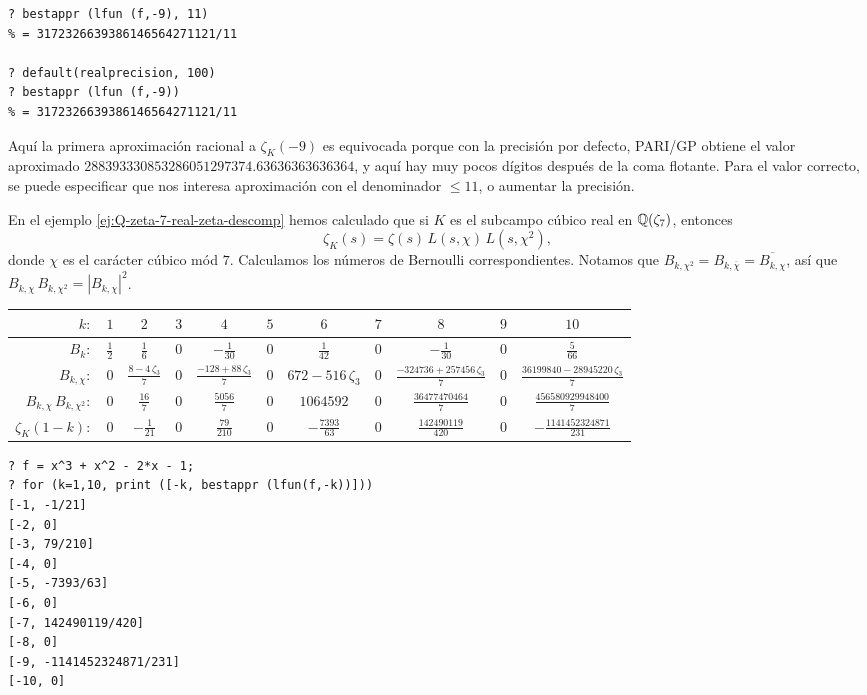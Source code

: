 \begin{ejemplo}
\begin{shaded}
\begin{verbatim}
? bestappr (lfun (f,-9), 11)
% = 3172326639386146564271121/11

? default(realprecision, 100)
? bestappr (lfun (f,-9))
% = 3172326639386146564271121/11
\end{verbatim}
\end{shaded}

  Aquí la primera aproximación racional a $\zeta_K (-9)$ es equivocada porque
  con la precisión por defecto, PARI/GP obtiene el valor aproximado
  $288393330853286051297374.63636363636364$, y aquí hay muy pocos dígitos
  después de la coma flotante. Para el valor correcto, se puede especificar
  que nos interesa aproximación con el denominador $\le 11$, o aumentar
  la precisión.
\end{ejemplo}

\begin{ejemplo}
  En el ejemplo \ref{ej:Q-zeta-7-real-zeta-descomp} hemos calculado que si $K$
  es el subcampo cúbico real en $\mathbb{Q} (\zeta_7)$, entonces
  $$\zeta_K (s) = \zeta (s) \, L (s,\chi) \, L (s,\chi^2),$$
  donde $\chi$ es el carácter cúbico mód $7$. Calculamos los números de
  Bernoulli correspondientes. Notamos que
  $B_{k,\chi^2} = B_{k,\overline{\chi}} = \overline{B_{k,\chi}}$, así que
  $B_{k,\chi}\,B_{k,\chi^2} = |B_{k,\chi}|^2$.

  \begin{center}
    \renewcommand{\arraystretch}{1.5}
    \begin{tabular}{rcccccccccc}
      \hline
      $k\colon$ & $1$ & $2$ & $3$ & $4$ & $5$ & $6$ & $7$ & $8$ & $9$ & $10$ \\
      \hline
      $B_k\colon$ & $\frac{1}{2}$ & $\frac{1}{6}$ & $0$ & $-\frac{1}{30}$ & $0$ & $\frac{1}{42}$ & $0$ & $-\frac{1}{30}$ & $0$ & $\frac{5}{66}$ \\
      \hline
      $B_{k,\chi}\colon$ & $0$ & $\frac{8-4\,\zeta_3}{7}$ & $0$ & $\frac{-128 + 88\,\zeta_3}{7}$ & $0$ & $672 - 516\,\zeta_3$ & $0$ & $\frac{-324736 + 257456\,\zeta_3}{7}$ & $0$ & $\frac{36199840 - 28945220\,\zeta_3}{7}$ \\
      \hline
      $B_{k,\chi}\,B_{k,\chi^2}\colon$ & $0$ & $\frac{16}{7}$ & $0$ & $\frac{5056}{7}$ & $0$ & $1064592$ & $0$ & $\frac{36477470464}{7}$ & $0$ & $\frac{456580929948400}{7}$ \\
      \hline
      $\zeta_K (1-k)\colon$ & $0$ & $-\frac{1}{21}$ & $0$ & $\frac{79}{210}$ & $0$ & $-\frac{7393}{63}$ & $0$ & $\frac{142490119}{420}$ & $0$ & $-\frac{1141452324871}{231}$ \\
      \hline
    \end{tabular}
  \end{center}

  \begin{shaded}
\begin{verbatim}
? f = x^3 + x^2 - 2*x - 1;
? for (k=1,10, print ([-k, bestappr (lfun(f,-k))]))
[-1, -1/21]
[-2, 0]
[-3, 79/210]
[-4, 0]
[-5, -7393/63]
[-6, 0]
[-7, 142490119/420]
[-8, 0]
[-9, -1141452324871/231]
[-10, 0]
\end{verbatim}
\end{shaded}
\end{ejemplo}

